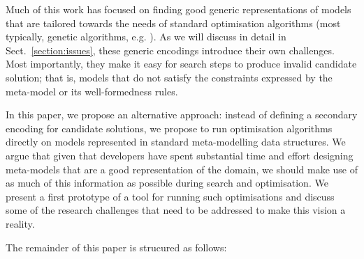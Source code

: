 	Much of this work has focused on finding good generic representations of models that are tailored towards the needs of standard optimisation algorithms (most
	typically, genetic algorithms, e.g. \cite{Deb+02}). As we will discuss in detail in Sect.~\ref{section:issues}, these generic encodings introduce their own
	challenges. Most importantly, they make it easy for search steps to produce invalid candidate solution; that is, models that do not satisfy the constraints
	expressed by the meta-model or its well-formedness rules.
	
	In this paper, we propose an alternative approach: instead of defining a secondary encoding for candidate solutions, we propose to run optimisation algorithms
	directly on models represented in standard meta-modelling data structures. We argue that given that developers have spent substantial time and effort designing
	meta-models that are a good representation of the domain, we should make use of as much of this information as possible during search and optimisation. We
	present a first prototype of a tool for running such optimisations and discuss some of the research challenges that need to be addressed to make this vision a
	reality.
	
	The remainder of this paper is strucured as follows: \draft{}